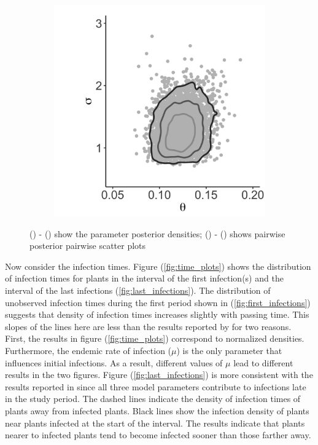 \documentclass{uwstat572}
\begin{document}
\begin{figure}[H]
\begin{subfigure}[b]{0.3\textwidth}
		\caption{}
		\label{fig:muTheta}
	\end{subfigure}
	\hfill
	\begin{subfigure}[b]{0.3\textwidth}
		\includegraphics[width=\textwidth]{figures/figure_2f.png}
		\caption{}
		\label{fig:sigmaTheta}
	\end{subfigure} 
	\caption{() - () show the parameter posterior densities;  () - () shows pairwise posterior pairwise scatter plots }
	\label{fig:muSigmaThetaDensities}
\end{figure} 

Now consider the infection times. 
Figure (\ref{fig:time_plots}) shows the distribution of infection times for plants in the interval of the first infection(s) and the interval of the last infections (\ref{fig:last_infections}). 
The distribution of unobserved infection times during the first period shown in (\ref{fig:first_infections}) suggests that density of infection times increases slightly with passing time. 
This slopes of the lines here are less than the results reported by \citet{Brown} for two reasons. 
First, the results in figure (\ref{fig:time_plots}) correspond to normalized densities. 
Furthermore, the endemic rate of infection ($\mu$) is the only parameter that influences initial infections. 
As a result, different values of $\mu$ lead to different results in the two figures. 
Figure (\ref{fig:last_infections}) is more consistent with the results reported in \citet{Brown} since all three model parameters contribute to infections late in the study period. 
The dashed lines indicate the density of infection times of plants away from infected plants. 
Black lines show the infection density of plants near plants infected at the start of the interval. 
The results indicate that plants nearer to infected plants tend to become infected sooner than those farther away. 
\end{document}
